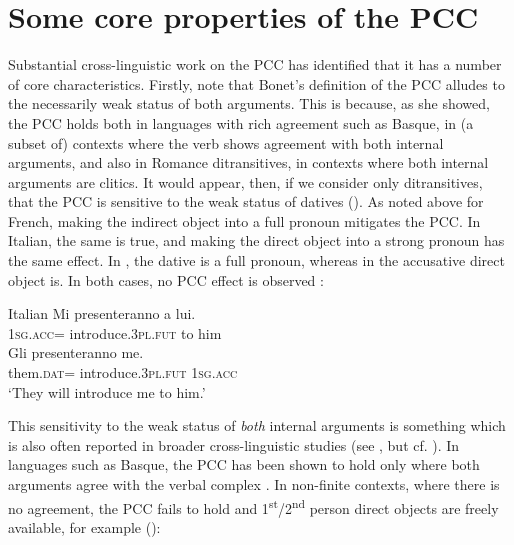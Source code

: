 \documentclass[output=paper,colorlinks,citecolor=brown,nonflat]{./langscibook}
\begin{document}
\section{Some core properties of the PCC}\label{sec:sheehan:2}

Substantial cross-linguistic work on the PCC has identified that it has a number of core characteristics. Firstly, note that Bonet’s definition of the PCC alludes to the necessarily weak status of both arguments. This is because, as she showed, the PCC holds both in languages with rich agreement such as Basque, in (a subset of) contexts where the verb shows agreement with both internal arguments, and also in Romance ditransitives, in contexts where both internal arguments are clitics. It would appear, then, if we consider only ditransitives, that the PCC is sensitive to the weak status of datives (\citealt{Bonet1991, Anagnostopoulou2005, Bianchi2006, Stegovec2017}). As noted above for French, making the indirect object into a full pronoun mitigates the PCC. In Italian, the same is true, and making the direct object into a strong pronoun has the same effect. In , the dative is a full pronoun, whereas in  the accusative direct object is. In both cases, no PCC effect is observed \citep{Bianchi2006}:

\ea%
    \label{ex:sheehan:9}
    Italian \citep[2041]{Bianchi2006}
    \ea\label{ex:sheehan:9a}
    \gll    Mi   presenteranno       a  lui.\\
            \textsc{1sg}.\textsc{acc}=  introduce.\textsc{3pl}.\textsc{fut}   to   him\\
    \ex\label{ex:sheehan:9b}
    \gll    Gli     presenteranno       me.\\
            them.\textsc{dat=}  introduce.\textsc{3pl}.\textsc{fut} \textsc{1sg}.\textsc{acc}\\
    \glt    ‘They will introduce me to him.’
    \z
\z

This sensitivity to the weak status of \textit{both} internal arguments is something which is also often reported in broader cross-linguistic studies (see \citealt{Stegovec2017}, but cf. \citealt{OrmazabalRomero2007}). In languages such as Basque, the PCC has been shown to hold only where both arguments agree with the verbal complex \citep{Laka1996}. In non-finite contexts, where there is no agreement, the PCC fails to hold and 1\textsuperscript{st}/2\textsuperscript{nd} person direct objects are freely available, for example (\citealt{Laka1996, Preminger2019}): 
\end{document}
